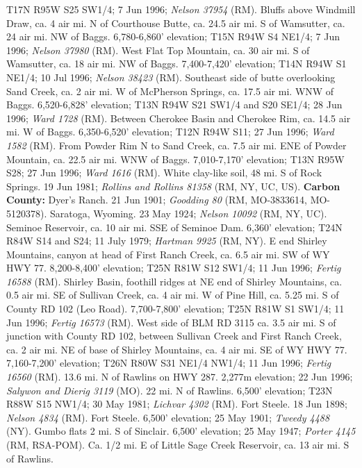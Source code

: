 T17N R95W S25 SW1/4; 7 Jun 1996; \textit{Nelson 37954} (RM).
Bluffs above Windmill Draw, ca. 4 air mi. N of Courthouse Butte, ca. 24.5 air
mi. S of Wamsutter, ca. 24 air mi. NW of Baggs. 6,780-6,860' elevation;
T15N R94W S4 NE1/4; 7 Jun 1996; \textit{Nelson 37980} (RM).
West Flat Top Mountain, ca. 30 air mi. S of Wamsutter, ca. 18 air mi. NW of
Baggs. 7,400-7,420' elevation; T14N R94W S1 NE1/4; 10 Jul 1996;
\textit{Nelson 38423} (RM).
Southeast side of butte overlooking Sand Creek, ca. 2 air mi. W of McPherson
Springs, ca. 17.5 air mi. WNW of Baggs. 6,520-6,828' elevation;
T13N R94W S21 SW1/4 and S20 SE1/4; 28 Jun 1996; \textit{Ward 1728} (RM).
Between Cherokee Basin and Cherokee Rim, ca. 14.5 air mi. W of Baggs.
6,350-6,520' elevation; T12N R94W S11; 27 Jun 1996; \textit{Ward 1582} (RM).
From Powder Rim N to Sand Creek, ca. 7.5 air mi. ENE of Powder Mountain, ca.
22.5 air mi. WNW of Baggs. 7,010-7,170' elevation; T13N R95W S28; 27 Jun 1996;
\textit{Ward 1616} (RM).
White clay-like soil, 48 mi. S of Rock Springs. 19 Jun 1981;
\textit{Rollins and Rollins 81358} (RM, NY, UC, US).
  \textbf{Carbon County:}
Dyer’s Ranch. 21 Jun 1901; \textit{Goodding 80} (RM, MO-3833614, MO-5120378).
Saratoga, Wyoming. 23 May 1924; \textit{Nelson 10092} (RM, NY, UC).
Seminoe Reservoir, ca. 10 air mi. SSE of Seminoe Dam. 6,360’ elevation;
T24N R84W S14 and S24; 11 July 1979; \textit{Hartman 9925} (RM, NY).
E end Shirley Mountains, canyon at head of First Ranch Creek, ca. 6.5 air mi.
SW of WY HWY 77. 8,200-8,400’ elevation; T25N R81W S12 SW1/4; 11 Jun 1996;
\textit{Fertig 16588} (RM).
Shirley Basin, foothill ridges at NE end of Shirley Mountains, ca. 0.5 air mi.
SE of Sullivan Creek, ca. 4 air mi. W of Pine Hill, ca. 5.25 mi. S of County RD
102 (Leo Road). 7,700-7,800’ elevation; T25N R81W S1 SW1/4; 11 Jun 1996;
\textit{Fertig 16573} (RM).
West side of BLM RD 3115 ca. 3.5 air mi. S of junction with County RD 102,
between Sullivan Creek and First Ranch Creek, ca. 2 air mi. NE of base of
Shirley Mountains, ca. 4 air mi. SE of WY HWY 77. 7,160-7,200’ elevation;
T26N R80W S31 NE1/4 NW1/4; 11 Jun 1996; \textit{Fertig 16560} (RM).
13.6 mi. N of Rawlins on HWY 287. 2,277m elevation; 22 Jun 1996;
\textit{Salywon and Dierig 3119} (MO).
22 mi. N of Rawlins. 6,500’ elevation; T23N R88W S15 NW1/4; 30 May 1981;
\textit{Lichvar 4302} (RM).
Fort Steele. 18 Jun 1898; \textit{Nelson 4834} (RM).
Fort Steele. 6,500’ elevation; 25 May 1901; \textit{Tweedy 4488} (NY).
Gumbo flats 2 mi. S of Sinclair. 6,500’ elevation; 25 May 1947;
\textit{Porter 4145} (RM, RSA-POM).
Ca. 1/2 mi. E of Little Sage Creek Reservoir, ca. 13 air mi. S of Rawlins.
